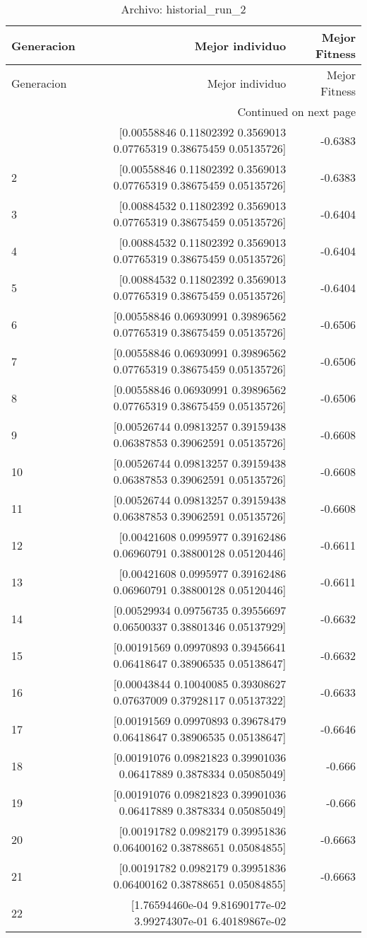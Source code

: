\begin{longtable}{lrr}
\caption{Archivo: historial\_run\_2}\label{tab:historial_run_2} \\
\toprule
Generacion & Mejor individuo & Mejor Fitness \\
\midrule
\endfirsthead
\toprule
Generacion & Mejor individuo & Mejor Fitness \\
\midrule
\endhead
\midrule
\multicolumn{3}{r}{Continued on next page} \\
\midrule
\endfoot
\bottomrule
\endlastfoot
1 & [0.00558846 0.11802392 0.3569013  0.07765319 0.38675459 0.05135726] & -0.6383 \\
2 & [0.00558846 0.11802392 0.3569013  0.07765319 0.38675459 0.05135726] & -0.6383 \\
3 & [0.00884532 0.11802392 0.3569013  0.07765319 0.38675459 0.05135726] & -0.6404 \\
4 & [0.00884532 0.11802392 0.3569013  0.07765319 0.38675459 0.05135726] & -0.6404 \\
5 & [0.00884532 0.11802392 0.3569013  0.07765319 0.38675459 0.05135726] & -0.6404 \\
6 & [0.00558846 0.06930991 0.39896562 0.07765319 0.38675459 0.05135726] & -0.6506 \\
7 & [0.00558846 0.06930991 0.39896562 0.07765319 0.38675459 0.05135726] & -0.6506 \\
8 & [0.00558846 0.06930991 0.39896562 0.07765319 0.38675459 0.05135726] & -0.6506 \\
9 & [0.00526744 0.09813257 0.39159438 0.06387853 0.39062591 0.05135726] & -0.6608 \\
10 & [0.00526744 0.09813257 0.39159438 0.06387853 0.39062591 0.05135726] & -0.6608 \\
11 & [0.00526744 0.09813257 0.39159438 0.06387853 0.39062591 0.05135726] & -0.6608 \\
12 & [0.00421608 0.0995977  0.39162486 0.06960791 0.38800128 0.05120446] & -0.6611 \\
13 & [0.00421608 0.0995977  0.39162486 0.06960791 0.38800128 0.05120446] & -0.6611 \\
14 & [0.00529934 0.09756735 0.39556697 0.06500337 0.38801346 0.05137929] & -0.6632 \\
15 & [0.00191569 0.09970893 0.39456641 0.06418647 0.38906535 0.05138647] & -0.6632 \\
16 & [0.00043844 0.10040085 0.39308627 0.07637009 0.37928117 0.05137322] & -0.6633 \\
17 & [0.00191569 0.09970893 0.39678479 0.06418647 0.38906535 0.05138647] & -0.6646 \\
18 & [0.00191076 0.09821823 0.39901036 0.06417889 0.3878334  0.05085049] & -0.666 \\
19 & [0.00191076 0.09821823 0.39901036 0.06417889 0.3878334  0.05085049] & -0.666 \\
20 & [0.00191782 0.0982179  0.39951836 0.06400162 0.38788651 0.05084855] & -0.6663 \\
21 & [0.00191782 0.0982179  0.39951836 0.06400162 0.38788651 0.05084855] & -0.6663 \\
22 & [1.76594460e-04 9.81690177e-02 3.99274307e-01 6.40189867e-02


\end{longtable}
